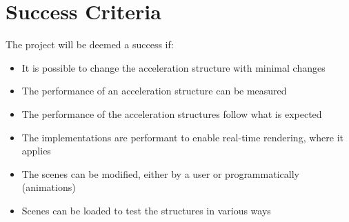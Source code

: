 \section*{Success Criteria}

The project will be deemed a success if:
\begin{itemize}
  \item It is possible to change the acceleration structure with minimal changes
  \item The performance of an acceleration structure can be measured
  \item The performance of the acceleration structures follow what is expected
  \item The implementations are performant to enable real-time rendering, where
    it applies
  \item The scenes can be modified, either by a user or
    programmatically (animations)
  \item Scenes can be loaded to test the structures in various ways
\end{itemize}
